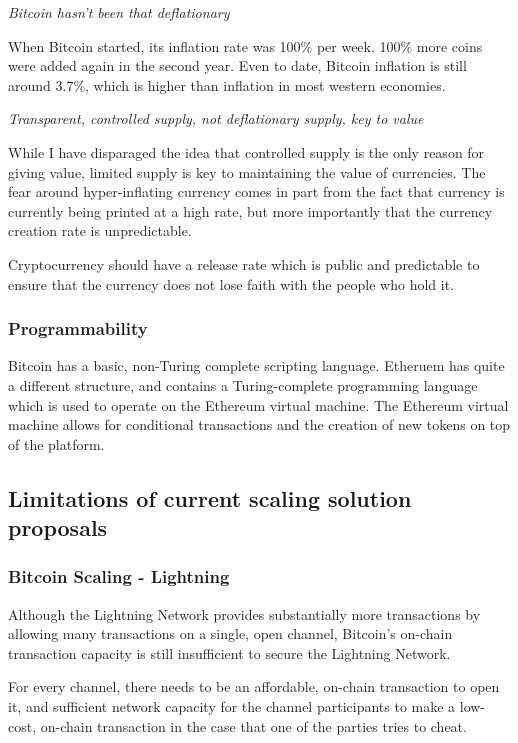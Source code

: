 \documentclass[a4paper,12pt]{article}
\begin{document}
\textit{Bitcoin hasn't been that deflationary}

When Bitcoin started, its inflation rate was 100\% per week. 100\% more coins were added again in the second year. Even to date, Bitcoin inflation is still around 3.7\%, which is higher than inflation in most western economies.

\textit{Transparent, controlled supply, not deflationary supply, key to value}

While I have disparaged the idea that controlled supply is the only reason for giving value, limited supply is key to maintaining the value of currencies. The fear around hyper-inflating currency comes in part from the fact that currency is currently being printed at a high rate, but more importantly that the currency creation rate is unpredictable. 

Cryptocurrency should have a release rate which is public and predictable to ensure that the currency does not lose faith with the people who hold it. 

\subsubsection{Programmability}
Bitcoin has a basic, non-Turing complete scripting language. Etheruem has quite a different structure, and contains a Turing-complete programming language which is used to operate on the Ethereum virtual machine. The Ethereum virtual machine allows for conditional transactions and the creation of new tokens on top of the platform. 

\subsection{Limitations of current scaling solution proposals}

\subsubsection{Bitcoin Scaling - Lightning}
Although the Lightning Network provides substantially more transactions by allowing many transactions on a single, open channel, Bitcoin’s on-chain transaction capacity is still insufficient to secure the Lightning Network. 

For every channel, there needs to be an affordable, on-chain transaction to open it, and sufficient network capacity for the channel participants to make a low-cost, on-chain transaction in the case that one of the parties tries to cheat. 
\end{document}
